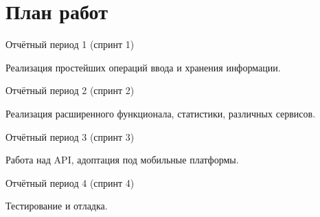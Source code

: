 \documentclass[a4paper,12pt]{article} %
\begin{document}
\section*{План работ}

\begin{enumerate}
{\item Отчётный период 1 (спринт 1)}

Реализация простейших операций ввода и хранения информации.

{\item Отчётный период 2 (спринт 2)}

Реализация расширенного функционала, статистики, различных сервисов.

{\item Отчётный период 3 (спринт 3)}

Работа над API, адоптация под мобильные платформы.

{\item Отчётный период 4 (спринт 4)}

Тестирование и отладка.


\end{enumerate}
\end{document}
